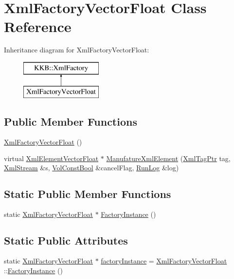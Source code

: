 \hypertarget{class_xml_factory_vector_float}{}\section{Xml\+Factory\+Vector\+Float Class Reference}
\label{class_xml_factory_vector_float}
Inheritance diagram for Xml\+Factory\+Vector\+Float\+:\begin{figure}[H]
\begin{center}
\leavevmode
\includegraphics[height=2.000000cm]{class_xml_factory_vector_float}
\end{center}
\end{figure}
\subsection*{Public Member Functions}
\begin{DoxyCompactItemize}
\item 
\hyperlink{class_xml_factory_vector_float_a4193a56fa6b1e30c61ebf87812cf270e}{Xml\+Factory\+Vector\+Float} ()
\item 
virtual \hyperlink{class_k_k_b_1_1_xml_element_vector_float}{Xml\+Element\+Vector\+Float} $\ast$ \hyperlink{class_xml_factory_vector_float_ad77c7eed4f2da463f1551e01c27e3e57}{Manufature\+Xml\+Element} (\hyperlink{namespace_k_k_b_a9253a3ea8a5da18ca82be4ca2b390ef0}{Xml\+Tag\+Ptr} tag, \hyperlink{class_k_k_b_1_1_xml_stream}{Xml\+Stream} \&s, \hyperlink{namespace_k_k_b_a7d390f568e2831fb76b86b56c87bf92f}{Vol\+Const\+Bool} \&cancel\+Flag, \hyperlink{class_k_k_b_1_1_run_log}{Run\+Log} \&log)
\end{DoxyCompactItemize}
\subsection*{Static Public Member Functions}
\begin{DoxyCompactItemize}
\item 
static \hyperlink{class_xml_factory_vector_float}{Xml\+Factory\+Vector\+Float} $\ast$ \hyperlink{class_xml_factory_vector_float_a970f053a5cdef0dbb5431e2829a1930f}{Factory\+Instance} ()
\end{DoxyCompactItemize}
\subsection*{Static Public Attributes}
\begin{DoxyCompactItemize}
\item 
static \hyperlink{class_xml_factory_vector_float}{Xml\+Factory\+Vector\+Float} $\ast$ \hyperlink{class_xml_factory_vector_float_ad70fc46005dbd23981b842ff413542df}{factory\+Instance} = \hyperlink{class_xml_factory_vector_float}{Xml\+Factory\+Vector\+Float} \+::\hyperlink{class_xml_factory_vector_float_a970f053a5cdef0dbb5431e2829a1930f}{Factory\+Instance} ()
\end{DoxyCompactItemize}


